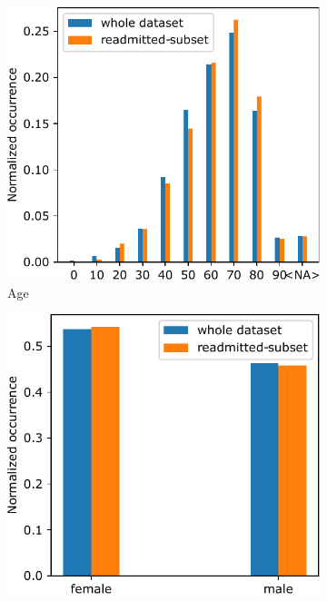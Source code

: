 \documentclass[a4paper,11pt]{article}
\begin{document}
\begin{figure}[htb]
\centering
\begin{subfigure}{0.24\textwidth}
    \includegraphics[width=\textwidth]{images/discrim_global_age.pdf}
    \caption{Age}
    \label{fig:discrim_global_age}
\end{subfigure}
\hfill
\begin{subfigure}{0.24\textwidth}
    \includegraphics[width=\textwidth]{images/discrim_global_gender.pdf}

\end{subfigure}
\end{figure}
\end{document}

